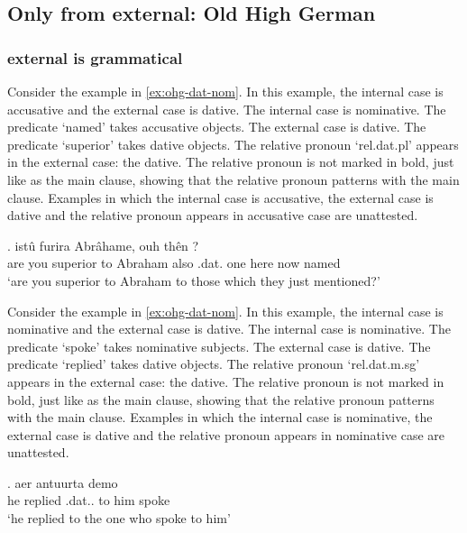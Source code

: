 \subsection{Only from external: Old High German}


  \subsubsection{external is grammatical}


Consider the example in \ref{ex:ohg-dat-nom}. In this example, the internal case is accusative and the external case is dative.
The internal case is nominative. The predicate  `named' takes accusative objects.
The external case is dative. The predicate  `superior' takes dative objects.
The relative pronoun  `\ac{rel}.\ac{dat}.\ac{pl}' appears in the external case: the dative. The relative pronoun is not marked in bold, just like as the main clause, showing that the relative pronoun patterns with the main clause.
Examples in which the internal case is accusative, the external case is dative and the relative pronoun appears in accusative case are unattested.

\exg. istû furira Abrâhame, ouh thên    ?\\
 {are you} superior\scsub{[dat]} {to Abraham} also .\ac{dat}. one here now named\scsub{[acc]}\\
 `are you superior to Abraham to those which they just mentioned?' \label{ex:ohg-dat-acc}

Consider the example in \ref{ex:ohg-dat-nom}. In this example, the internal case is nominative and the external case is dative.
The internal case is nominative. The predicate  `spoke' takes nominative subjects.
The external case is dative. The predicate  `replied' takes dative objects.
The relative pronoun  `\ac{rel}.\ac{dat}.\ac{m}.\ac{sg}' appears in the external case: the dative. The relative pronoun is not marked in bold, just like as the main clause, showing that the relative pronoun patterns with the main clause.
Examples in which the internal case is nominative, the external case is dative and the relative pronoun appears in nominative case are unattested.

\exg. aer antuurta demo  \\
 he replied\scsub{[dat]} .\ac{dat}.. {to him} spoke\scsub{[nom]}\\
 `he replied to the one who spoke to him' \label{ex:ohg-dat-nom}

